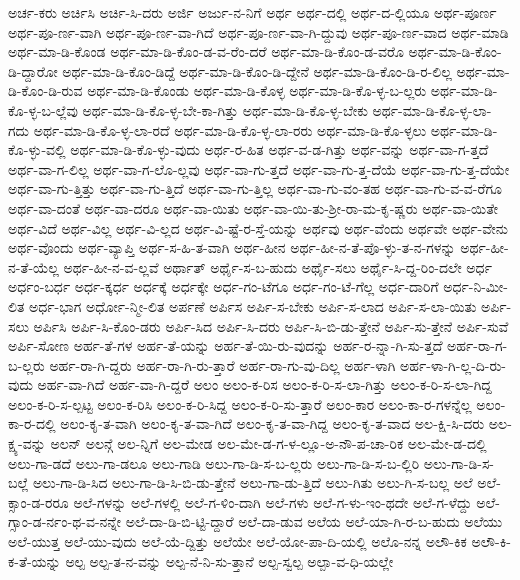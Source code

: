 {ಅರ್ಚ-ಕರು
ಅರ್ಚಿಸಿ
ಅರ್ಚಿ-ಸಿ-ದರು
ಅರ್ಜಿ
ಅರ್ಜು-ನ-ನಿಗೆ
ಅರ್ಥ
ಅರ್ಥ-ದಲ್ಲಿ
ಅರ್ಥ-ದ-ಲ್ಲಿಯೂ
ಅರ್ಥ-ಪೂರ್ಣ
ಅರ್ಥ-ಪೂ-ರ್ಣ-ವಾಗಿ
ಅರ್ಥ-ಪೂ-ರ್ಣ-ವಾ-ಗಿದೆ
ಅರ್ಥ-ಪೂ-ರ್ಣ-ವಾ-ಗಿ-ದ್ದುವು
ಅರ್ಥ-ಪೂ-ರ್ಣ-ವಾದ
ಅರ್ಥ-ಮಾಡಿ
ಅರ್ಥ-ಮಾ-ಡಿ-ಕೊಂಡ
ಅರ್ಥ-ಮಾ-ಡಿ-ಕೊಂ-ಡ-ವ-ರೆಂ-ದರೆ
ಅರ್ಥ-ಮಾ-ಡಿ-ಕೊಂ-ಡ-ವರೊ
ಅರ್ಥ-ಮಾ-ಡಿ-ಕೊಂ-ಡಿ-ದ್ದಾರೋ
ಅರ್ಥ-ಮಾ-ಡಿ-ಕೊಂ-ಡಿದ್ದೆ
ಅರ್ಥ-ಮಾ-ಡಿ-ಕೊಂ-ಡಿ-ದ್ದೇನೆ
ಅರ್ಥ-ಮಾ-ಡಿ-ಕೊಂ-ಡಿ-ರ-ಲಿಲ್ಲ
ಅರ್ಥ-ಮಾ-ಡಿ-ಕೊಂ-ಡಿ-ರುವ
ಅರ್ಥ-ಮಾ-ಡಿ-ಕೊಂಡು
ಅರ್ಥ-ಮಾ-ಡಿ-ಕೊಳ್ಳ
ಅರ್ಥ-ಮಾ-ಡಿ-ಕೊ-ಳ್ಳ-ಬ-ಲ್ಲರು
ಅರ್ಥ-ಮಾ-ಡಿ-ಕೊ-ಳ್ಳ-ಬ-ಲ್ಲೆವು
ಅರ್ಥ-ಮಾ-ಡಿ-ಕೊ-ಳ್ಳ-ಬೇ-ಕಾ-ಗಿತ್ತು
ಅರ್ಥ-ಮಾ-ಡಿ-ಕೊ-ಳ್ಳ-ಬೇಕು
ಅರ್ಥ-ಮಾ-ಡಿ-ಕೊ-ಳ್ಳ-ಲಾ-ಗದು
ಅರ್ಥ-ಮಾ-ಡಿ-ಕೊ-ಳ್ಳ-ಲಾ-ರದೆ
ಅರ್ಥ-ಮಾ-ಡಿ-ಕೊ-ಳ್ಳ-ಲಾ-ರರು
ಅರ್ಥ-ಮಾ-ಡಿ-ಕೊ-ಳ್ಳಲು
ಅರ್ಥ-ಮಾ-ಡಿ-ಕೊ-ಳ್ಳು-ವಲ್ಲಿ
ಅರ್ಥ-ಮಾ-ಡಿ-ಕೊ-ಳ್ಳು-ವುದು
ಅರ್ಥ-ರ-ಹಿತ
ಅರ್ಥ-ವ-ಡ-ಗಿತ್ತು
ಅರ್ಥ-ವನ್ನು
ಅರ್ಥ-ವಾ-ಗ-ತ್ತದೆ
ಅರ್ಥ-ವಾ-ಗ-ಲಿಲ್ಲ
ಅರ್ಥ-ವಾ-ಗ-ಲೊ-ಲ್ಲವು
ಅರ್ಥ-ವಾ-ಗು-ತ್ತದೆ
ಅರ್ಥ-ವಾ-ಗು-ತ್ತ-ದೆಯೆ
ಅರ್ಥ-ವಾ-ಗು-ತ್ತ-ದೆಯೇ
ಅರ್ಥ-ವಾ-ಗು-ತ್ತಿತ್ತು
ಅರ್ಥ-ವಾ-ಗು-ತ್ತಿದೆ
ಅರ್ಥ-ವಾ-ಗು-ತ್ತಿಲ್ಲ
ಅರ್ಥ-ವಾ-ಗು-ವಂ-ತಹ
ಅರ್ಥ-ವಾ-ಗು-ವ-ವ-ರೆಗೂ
ಅರ್ಥ-ವಾ-ದಂತೆ
ಅರ್ಥ-ವಾ-ದರೂ
ಅರ್ಥ-ವಾ-ಯಿತು
ಅರ್ಥ-ವಾ-ಯಿ-ತು-ಶ್ರೀ-ರಾ-ಮ-ಕೃ-ಷ್ಣರು
ಅರ್ಥ-ವಾ-ಯಿತೇ
ಅರ್ಥ-ವಿದೆ
ಅರ್ಥ-ವಿಲ್ಲ
ಅರ್ಥ-ವಿ-ಲ್ಲದ
ಅರ್ಥ-ವಿ-ಷ್ಟೆ-ರ-ಸ್ತೆ-ಯನ್ನು
ಅರ್ಥವು
ಅರ್ಥ-ವೆಂದು
ಅರ್ಥವೇ
ಅರ್ಥ-ವೇನು
ಅರ್ಥ-ವೊಂದು
ಅರ್ಥ-ವ್ಯಾಪ್ತಿ
ಅರ್ಥ-ಸ-ಹಿ-ತ-ವಾಗಿ
ಅರ್ಥ-ಹೀನ
ಅರ್ಥ-ಹೀ-ನ-ತೆ-ಪೊ-ಳ್ಳು-ತ-ನ-ಗಳನ್ನು
ಅರ್ಥ-ಹೀ-ನ-ತೆ-ಯೆಲ್ಲ
ಅರ್ಥ-ಹೀ-ನ-ವ-ಲ್ಲವೆ
ಅರ್ಥಾತ್
ಅರ್ಥೈ-ಸ-ಬ-ಹುದು
ಅರ್ಥೈ-ಸಲು
ಅರ್ಥೈ-ಸಿ-ದ್ದ-ರಿಂ-ದಲೇ
ಅರ್ಧ
ಅರ್ಧಂ-ಬರ್ಧ
ಅರ್ಧ-ಕ್ಕರ್ಧ
ಅರ್ಧಕ್ಕೆ
ಅರ್ಧಕ್ಕೇ
ಅರ್ಧ-ಗಂ-ಟೆಗೂ
ಅರ್ಧ-ಗಂ-ಟೆ-ಗೆಲ್ಲ
ಅರ್ಧ-ದಾರಿಗೆ
ಅರ್ಧ-ನಿ-ಮೀ-ಲಿತ
ಅರ್ಧ-ಭಾಗ
ಅರ್ಧೋ-ನ್ಮೀ-ಲಿತ
ಅರ್ಪಣೆ
ಅರ್ಪಿಸ
ಅರ್ಪಿ-ಸ-ಬೇಕು
ಅರ್ಪಿ-ಸ-ಲಾದ
ಅರ್ಪಿ-ಸ-ಲಾ-ಯಿತು
ಅರ್ಪಿ-ಸಲು
ಅರ್ಪಿಸಿ
ಅರ್ಪಿ-ಸಿ-ಕೊಂ-ಡರು
ಅರ್ಪಿ-ಸಿದ
ಅರ್ಪಿ-ಸಿ-ದರು
ಅರ್ಪಿ-ಸಿ-ಬಿ-ಡು-ತ್ತೇನೆ
ಅರ್ಪಿ-ಸು-ತ್ತೇನೆ
ಅರ್ಪಿ-ಸುವೆ
ಅರ್ಪಿ-ಸೋಣ
ಅರ್ಹ-ತೆ-ಗಳ
ಅರ್ಹ-ತೆ-ಯನ್ನು
ಅರ್ಹ-ತೆ-ಯಿ-ರು-ವುದನ್ನು
ಅರ್ಹ-ರ-ನ್ನಾ-ಗಿ-ಸು-ತ್ತದೆ
ಅರ್ಹ-ರಾ-ಗ-ಬ-ಲ್ಲರು
ಅರ್ಹ-ರಾ-ಗಿ-ದ್ದರು
ಅರ್ಹ-ರಾ-ಗಿ-ರು-ತ್ತಾರೆ
ಅರ್ಹ-ರಾ-ಗು-ವು-ದಿಲ್ಲ
ಅರ್ಹ-ಳಾಗಿ
ಅರ್ಹ-ಳಾ-ಗಿ-ಲ್ಲ-ದಿ-ರು-ವುದು
ಅರ್ಹ-ವಾ-ಗಿದೆ
ಅರ್ಹ-ವಾ-ಗಿ-ದ್ದರೆ
ಅಲಂ
ಅಲಂ-ಕ-ರಿಸ
ಅಲಂ-ಕ-ರಿ-ಸ-ಲಾ-ಗಿತ್ತು
ಅಲಂ-ಕ-ರಿ-ಸ-ಲಾ-ಗಿದ್ದ
ಅಲಂ-ಕ-ರಿ-ಸ-ಲ್ಪಟ್ಟ
ಅಲಂ-ಕ-ರಿಸಿ
ಅಲಂ-ಕ-ರಿ-ಸಿದ್ದ
ಅಲಂ-ಕ-ರಿ-ಸು-ತ್ತಾರೆ
ಅಲಂ-ಕಾರ
ಅಲಂ-ಕಾ-ರ-ಗಳನ್ನೆಲ್ಲ
ಅಲಂ-ಕಾ-ರ-ದಲ್ಲಿ
ಅಲಂ-ಕೃ-ತ-ವಾಗಿ
ಅಲಂ-ಕೃ-ತ-ವಾ-ಗಿದೆ
ಅಲಂ-ಕೃ-ತ-ವಾ-ಗಿದ್ದ
ಅಲಂ-ಕೃ-ತ-ವಾದ
ಅಲ-ಕ್ಷಿ-ಸಿ-ದರು
ಅಲ-ಕ್ಷ್ಯ-ವನ್ನು
ಅಲನ್
ಅಲನ್ಗೆ
ಅಲ-ನ್ನಿಗೆ
ಅಲ-ಮೇಡ
ಅಲ-ಮೇ-ಡ-ಗ-ಳ-ಲ್ಲೂ-ಅ-ನೌ-ಪ-ಚಾ-ರಿಕ
ಅಲ-ಮೇ-ಡ-ದಲ್ಲಿ
ಅಲು-ಗಾ-ಡದೆ
ಅಲು-ಗಾ-ಡಲೂ
ಅಲು-ಗಾಡಿ
ಅಲು-ಗಾ-ಡಿ-ಸ-ಬ-ಲ್ಲರು
ಅಲು-ಗಾ-ಡಿ-ಸ-ಬ-ಲ್ಲಿರಿ
ಅಲು-ಗಾ-ಡಿ-ಸ-ಬಲ್ಲೆ
ಅಲು-ಗಾ-ಡಿ-ಸಿದ
ಅಲು-ಗಾ-ಡಿ-ಸಿ-ಬಿ-ಡು-ತ್ತೇನೆ
ಅಲು-ಗಾ-ಡು-ತ್ತಿದೆ
ಅಲು-ಗಿತು
ಅಲು-ಗಿ-ಸ-ಬಲ್ಲ
ಅಲೆ
ಅಲೆ-ಕ್ಸಾಂ-ಡ-ರರೂ
ಅಲೆ-ಗಳನ್ನು
ಅಲೆ-ಗಳಲ್ಲಿ
ಅಲೆ-ಗ-ಳಿಂ-ದಾಗಿ
ಅಲೆ-ಗಳು
ಅಲೆ-ಗ-ಳು-ಇಂ-ಥದೇ
ಅಲೆ-ಗ-ಳೆದ್ದು
ಅಲೆ-ಗ್ಸಾಂ-ಡ-ರ್ನಂ-ಥ-ವ-ನನ್ನೇ
ಅಲೆ-ದಾ-ಡಿ-ಬಿ-ಟ್ಟಿ-ದ್ದಾರೆ
ಅಲೆ-ದಾ-ಡುವ
ಅಲೆಯ
ಅಲೆ-ಯಾ-ಗಿ-ರ-ಬ-ಹುದು
ಅಲೆಯು
ಅಲೆ-ಯುತ್ತ
ಅಲೆ-ಯು-ವುದು
ಅಲೆ-ಯೆ-ದ್ದಿತ್ತು
ಅಲೆಯೇ
ಅಲೆ-ಯೋ-ಪಾ-ದಿ-ಯಲ್ಲಿ
ಅಲೊ-ನನ್ನ
ಅಲೌ-ಕಿಕ
ಅಲೌ-ಕಿ-ಕ-ತೆ-ಯನ್ನು
ಅಲ್ಪ
ಅಲ್ಪ-ತ-ನ-ವನ್ನು
ಅಲ್ಪ-ನೆ-ನಿ-ಸು-ತ್ತಾನೆ
ಅಲ್ಪ-ಸ್ವಲ್ಪ
ಅಲ್ಪಾ-ವ-ಧಿ-ಯಲ್ಲೇ
}
